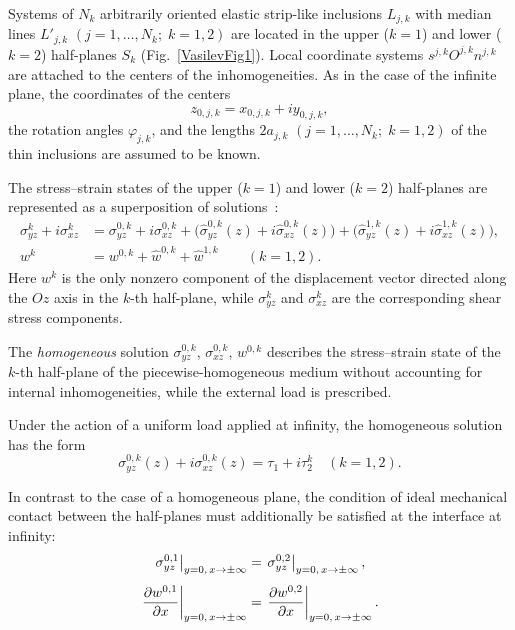 Systems of $N_k$ arbitrarily oriented elastic strip-like inclusions $L_{j,k}$ with median lines $L'_{j,k}$ $(j=1,\ldots,N_k;\; k=1,2)$ are located in the upper ($k=1$) and lower ($k=2$) half-planes $S_k$ (Fig.~\ref{VasilevFig1}). Local coordinate systems $s^{j,k}O^{j,k}n^{j,k}$ are attached to the centers of the inhomogeneities. As in the case of the infinite plane, the coordinates of the centers
\[
z_{0,j,k}=x_{0,j,k}+iy_{0,j,k},
\]
the rotation angles $\varphi_{j,k}$, and the lengths $2a_{j,k}$ $(j=1,\ldots,N_k;\; k=1,2)$ of the thin inclusions are assumed to be known.

The stress--strain states of the upper ($k=1$) and lower ($k=2$) half-planes are represented as a superposition of solutions~\cite{Vasilev23,Vasilev25,Vasilev27}:
\begin{equation}
	\begin{aligned}
\sigma_{yz}^{k}+i\sigma_{xz}^{k}
&=
\sigma_{yz}^{0,k}+i\sigma_{xz}^{0,k}
+
\Big(
\widehat{\sigma}_{yz}^{0,k}(z)+i\widehat{\sigma}_{xz}^{0,k}(z)
\Big)
+
\Big(
\widehat{\sigma}_{yz}^{1,k}(z)+i\widehat{\sigma}_{xz}^{1,k}(z)
\Big),
\\
	w^{k}
	&=
	w^{0,k}
	+
	\widehat{w}^{0,k}
	+
	\widehat{w}^{1,k}
	\qquad
	(k=1,2).
\end{aligned}
\label{VasilevEq10}
\end{equation}
%
Here $w^{k}$ is the only nonzero component of the displacement vector directed along the $Oz$ axis in the $k$-th half-plane, while $\sigma_{yz}^{k}$ and $\sigma_{xz}^{k}$ are the corresponding shear stress components.

The \emph{homogeneous} solution $\sigma_{yz}^{0,k}$, $\sigma_{xz}^{0,k}$, $w^{0,k}$ describes the stress--strain state of the $k$-th half-plane of the piecewise-homogeneous medium without accounting for internal inhomogeneities, while the external load is prescribed.

Under the action of a uniform load applied at infinity, the homogeneous solution has the form
\begin{equation}
	\sigma_{yz}^{0,k}(z)+i\sigma_{xz}^{0,k}(z)
	=
	\tau_1+i\tau_2^{k}
	\quad
	(k=1,2).
	\label{VasilevEq11}
\end{equation}

In contrast to the case of a homogeneous plane, the condition of ideal mechanical contact between the half-planes must additionally be satisfied at the interface at infinity:
\begin{align}
	\notag
	\left.\sigma_{yz}^{0,1}\right|_{y=0,\,x\to\pm\infty}
	&=
	\left.\sigma_{yz}^{0,2}\right|_{y=0,\,x\to\pm\infty},
	\\[4pt]
	\left.
	\frac{\partial w^{0,1}}{\partial x}
	\right|_{y=0,\,x\to\pm\infty}
	&=
	\left.
	\frac{\partial w^{0,2}}{\partial x}
	\right|_{y=0,\,x\to\pm\infty}.
	\label{VasilevEq12}
\end{align}

